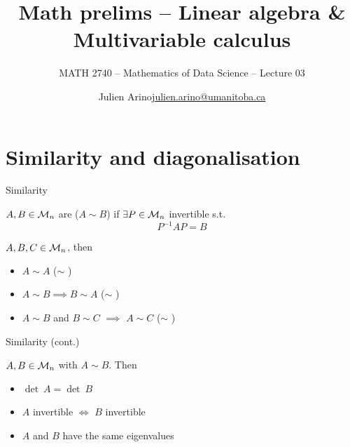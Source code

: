 \documentclass[aspectratio=169]{beamer}\usepackage[]{graphicx}\usepackage[]{xcolor}
\subtitle{MATH 2740 -- Mathematics of Data Science -- Lecture 03}
\author{\texorpdfstring{Julien Arino\newline\url{julien.arino@umanitoba.ca}}{Julien Arino}}
\institute{Department of Mathematics @ University of Manitoba}
\title{Math prelims -- Linear algebra \& Multivariable calculus}
\begin{document}
\setcounter{theorem}{28}


\section{Similarity and diagonalisation}

\begin{frame}{Similarity}
\begin{definition}[Similarity]
$A,B\in\mathcal{M}_n$ are  ($A\sim B$) if $\exists P\in\mathcal{M}_n$ invertible s.t.
\[
P^{-1}AP=B
\]
\end{definition}
\vfill
\begin{theorem}
$A,B,C\in\mathcal{M}_n$, then
\begin{itemize}
	\item $A\sim A$ \hfill ($\sim$ )
	\item $A\sim B\implies B\sim A$ \hfill ($\sim$ )
	\item $A\sim B$ and $B\sim C$ $\implies$ $A\sim C$ \hfill ($\sim$ )
\end{itemize}
\end{theorem}
\end{frame}

\begin{frame}{Similarity (cont.)}
\begin{theorem}
$A,B\in\mathcal{M}_n$ with $A\sim B$. Then
\begin{itemize}
	\item $\det\ A=\det\ B$
	\item $A$ invertible $\iff$ $B$ invertible
	\item $A$ and $B$ have the same eigenvalues
\end{itemize}
\end{theorem}
\end{frame}
\end{document}

